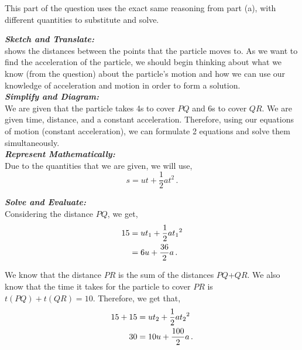 \begin{subquestions}
	
\subquestion

\begin{subsubquestions}
This part of the question uses the exact same reasoning from part (a), with different quantities to substitute and solve.

\subsubquestion
\textbf{\textit{Sketch and Translate:}} \\
 shows the distances between the points that the particle moves to. As we want to find the acceleration of the particle, we should begin thinking about what we know (from the question) about the particle's motion and how we can use our knowledge of acceleration and motion in order to form a solution. \\





\textbf{\textit{Simplify and Diagram:}} \\
We are given that the particle takes 4s to cover $PQ$ and 6s to cover $QR$. We are given time, distance, and a constant acceleration. Therefore, using our equations of motion (constant acceleration), we can formulate 2 equations and solve them simultaneously. \\




\textbf{\textit{Represent Mathematically:}} \\
Due to the quantities that we are given, we will use,
\begin{equation}
	s = ut + \frac{1}{2}at^2 \,.
\end{equation}




\textbf{\textit{Solve and Evaluate:}} \\
Considering the distance $PQ$, we get,
\begin{align}
	15 & = ut_1 + \frac{1}{2}a{t_1}^2 \nonumber \\
	& = 6u + \frac{36}{2}a \,. \label{2010:q5:MoveEqn3}
\end{align}

We know that the distance $PR$ is the sum of the distances $PQ$+$QR$. We also know that the time it takes for the particle to cover $PR$ is $t(PQ)+t(QR)=10$. Therefore, we get that,
\begin{align}
	15+15 & = ut_2 + \frac{1}{2}a{t_2}^2 \nonumber \\
	30 & = 10u + \frac{100}{2}a \,. \label{2010:q5:MoveEqn4}
\end{align}


\end{subsubquestions}
\end{subquestions}
